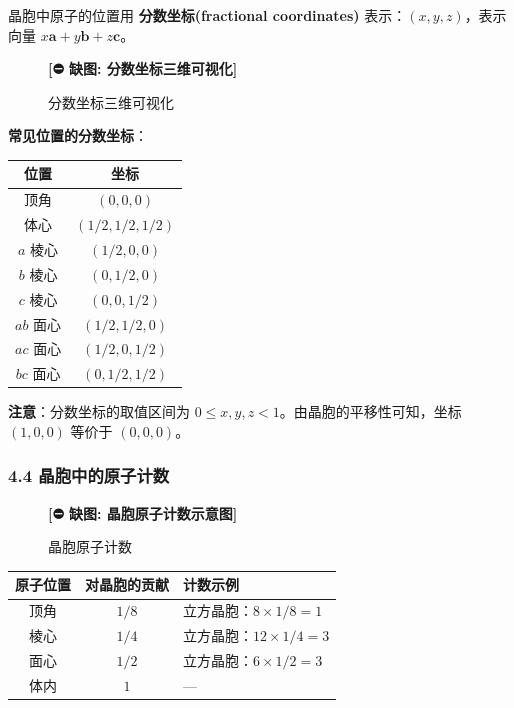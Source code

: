 \documentclass[a4paper,11pt]{ctexart}
\newcounter{none}
\newcommand{\箭}{\ensuremath{\rightarrow}}
\newcommand{\左箭}{\ensuremath{\leftarrow}}
\newcommand{\上箭}{\ensuremath{\uparrow}}
\newcommand{\下箭}{\ensuremath{\downarrow}}
\newcommand{\衡}{\ensuremath{\rightleftharpoons}}
\newcommand{\双箭}{\ensuremath{\leftrightarrow}}
\newcommand{\约等于}{\ensuremath{\approx}}
\newcommand{\小于等于}{\ensuremath{\leq}}
\newcommand{\大于等于}{\ensuremath{\geq}}
\newcommand{\不等于}{\ensuremath{\neq}}
\newcommand{\西格马}{\ensuremath{\sigma}}
\newcommand{\派}{\ensuremath{\pi}}
\begin{document}
晶胞中原子的位置用 \textbf{分数坐标(fractional coordinates)} 表示：\((x, y, z)\)，表示向量 \(x\boldsymbol{a} + y\boldsymbol{b} + z\boldsymbol{c}\)。

\begin{figure}[H]\centering
\textbf{[⛔ 缺图: 分数坐标三维可视化]}
\caption{分数坐标三维可视化}
\end{figure}

\textbf{常见位置的分数坐标}：

{\def\LTcaptype{none} %
\begin{longtable}[]{@{}cc@{}}
\toprule\noalign{}
位置 & 坐标 \\
\midrule\noalign{}
\endhead
\bottomrule\noalign{}
\endlastfoot
顶角 & \((0, 0, 0)\) \\
体心 & \((1/2, 1/2, 1/2)\) \\
\(a\) 棱心 & \((1/2, 0, 0)\) \\
\(b\) 棱心 & \((0, 1/2, 0)\) \\
\(c\) 棱心 & \((0, 0, 1/2)\) \\
\(ab\) 面心 & \((1/2, 1/2, 0)\) \\
\(ac\) 面心 & \((1/2, 0, 1/2)\) \\
\(bc\) 面心 & \((0, 1/2, 1/2)\) \\
\end{longtable}
}

\textbf{注意}：分数坐标的取值区间为 \(0 \leqslant x, y, z < 1\)。由晶胞的平移性可知，坐标 \((1, 0, 0)\) 等价于 \((0, 0, 0)\)。

\subsubsection{4.4 晶胞中的原子计数}\label{ux6676ux80deux4e2dux7684ux539fux5b50ux8ba1ux6570}

\begin{figure}[H]\centering
\textbf{[⛔ 缺图: 晶胞原子计数示意图]}
\caption{晶胞原子计数}
\end{figure}

{\def\LTcaptype{none} %
\begin{longtable}[]{@{}ccl@{}}
\toprule\noalign{}
原子位置 & 对晶胞的贡献 & 计数示例 \\
\midrule\noalign{}
\endhead
\bottomrule\noalign{}
\endlastfoot
顶角 & \(1/8\) & 立方晶胞：\(8 \times 1/8 = 1\) \\
棱心 & \(1/4\) & 立方晶胞：\(12 \times 1/4 = 3\) \\
面心 & \(1/2\) & 立方晶胞：\(6 \times 1/2 = 3\) \\
体内 & \(1\) & --- \\
\end{longtable}
}
\end{document}
